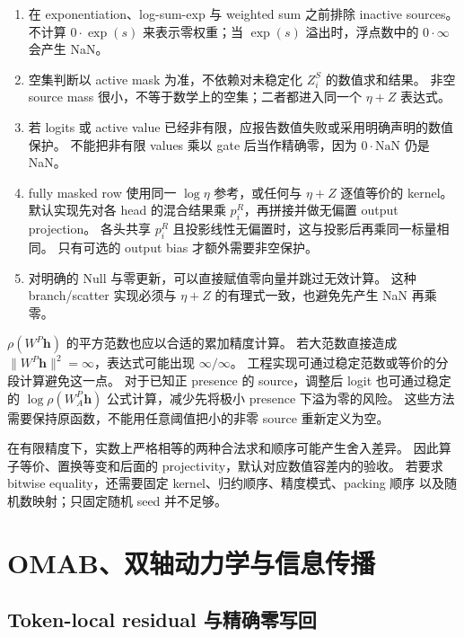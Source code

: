 \documentclass[11pt,UTF8,fontset=fandol]{ctexart}
\numberwithin{equation}{section}
\theoremstyle{definition}
\begin{document}
\begin{enumerate}[leftmargin=2.2em]
 \item 在 exponentiation、log-sum-exp 与 weighted sum 之前排除 inactive sources。
  不计算 $0\cdot\exp(s)$ 来表示零权重；当 $\exp(s)$ 溢出时，浮点数中的
  $0\cdot\infty$ 会产生 NaN。
 \item 空集判断以 active mask 为准，不依赖对未稳定化 $Z_i^S$ 的数值求和结果。
  非空 source mass 很小，不等于数学上的空集；二者都进入同一个 $\eta+Z$ 表达式。
 \item 若 logits 或 active value 已经非有限，应报告数值失败或采用明确声明的数值保护。
  不能把非有限 values 乘以 gate 后当作精确零，因为 $0\cdot\mathrm{NaN}$ 仍是 NaN。
 \item fully masked row 使用同一 $\log\eta$ 参考，或任何与 $\eta+Z$ 逐值等价的 kernel。
  默认实现先对各 head 的混合结果乘 $p_i^R$，再拼接并做无偏置 output projection。
  各头共享 $p_i^R$ 且投影线性无偏置时，这与投影后再乘同一标量相同。
  只有可选的 output bias 才额外需要非空保护。
 \item 对明确的 Null 与零更新，可以直接赋值零向量并跳过无效计算。
  这种 branch/scatter 实现必须与 $\eta+Z$ 的有理式一致，也避免先产生 NaN 再乘零。
\end{enumerate}

$\rho(W^{P}\bm h)$ 的平方范数也应以合适的累加精度计算。
若大范数直接造成 $\|W^P\bm h\|^2=\infty$，表达式可能出现 $\infty/\infty$。
工程实现可通过稳定范数或等价的分段计算避免这一点。
对于已知正 presence 的 source，调整后 logit 也可通过稳定的
$\log\rho(W_A^{P}\bm h)$ 公式计算，减少先将极小 presence 下溢为零的风险。
这些方法需要保持原函数，不能用任意阈值把小的非零 source 重新定义为空。

在有限精度下，实数上严格相等的两种合法求和顺序可能产生舍入差异。
因此算子等价、置换等变和后面的 projectivity，默认对应数值容差内的验收。
若要求 bitwise equality，还需要固定 kernel、归约顺序、精度模式、packing 顺序
以及随机数映射；只固定随机 seed 并不足够。


\section{OMAB、双轴动力学与信息传播}
\label{sec:A:dynamics}

\subsection{Token-local residual 与精确零写回}
\label{subsec:A:omab}
\end{document}
